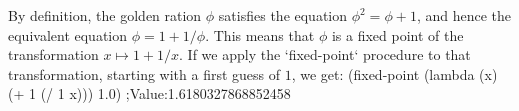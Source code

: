 By definition, the golden ration $\phi$ satisfies the equation $\phi^2 = \phi + 1$, and hence the equivalent equation $\phi = 1 + 1/\phi$.  This means that $\phi$ is a fixed point of the transformation $x \mapsto 1 + 1/x$.
If we apply the `fixed-point` procedure to that transformation, starting with a first guess of $1$, we get:
\begtt\scm
(fixed-point (lambda (x) (+ 1 (/ 1 x))) 1.0)
;Value:1.6180327868852458
\endtt
